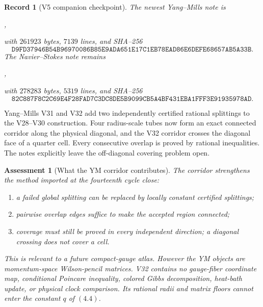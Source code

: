 \documentclass[11pt]{article}
\newtheorem{assessment}[theorem]{Assessment}
\newtheorem{record}[theorem]{Record}
\theoremstyle{remark}
\begin{document}
\begin{record}[V5 companion checkpoint]
\label{rec:v15v5-companions}
The newest Yang--Mills note is
\begin{center}
,
\end{center}
with \(261923\) bytes, \(7139\) lines, and SHA--256
\[
 \texttt{D9FD37946B54B96970086B85E9ADA651E17C1EB78EAD86E6DEFE68657AB5A33B}.
                                                                  \tag{5.1}
\]
The Navier--Stokes note remains
\begin{center}
,
\end{center}
with \(278283\) bytes, \(5319\) lines, and SHA--256
\[
 \texttt{82C887F8C2C69E4F28FAD7C3DC8DE5B9099CB5A4BF431EBA1FFF3E91935978AD}.
                                                                  \tag{5.2}
\]
\end{record}

Yang--Mills V31 and V32 add two independently certified rational
splittings to the V28--V30 construction.  Four radius-scale tubes
now form an exact connected corridor along the physical diagonal,
and the V32 corridor crosses the diagonal face of a quarter cell.
Every consecutive overlap is proved by rational inequalities.
The notes explicitly leave the off-diagonal covering problem open.

\begin{assessment}[What the YM corridor contributes]
\label{ass:v15v5-ym}
The corridor strengthens the method imported at the fourteenth
cycle close:
\begin{enumerate}
\item a failed global splitting can be replaced by locally constant
      certified splittings;
\item pairwise overlap edges suffice to make the accepted region
      connected;
\item coverage must still be proved in every independent direction;
      a diagonal crossing does not cover a cell.
\end{enumerate}
This is relevant to a future compact-gauge atlas.  However the YM
objects are momentum-space Wilson-pencil matrices.  V32 contains
no gauge-fiber coordinate map, conditional Poincare inequality,
colored Gibbs decomposition, heat-bath update, or physical clock
comparison.  Its rational radii and matrix floors cannot enter the
constant \(q\) of \((4.4)\).
\end{assessment}
\end{document}
